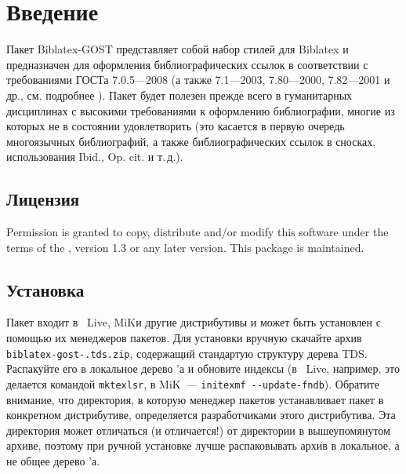 \documentclass[10pt,a4paper,headings=small,numbers=enddot,english,russian]{ltxdockit}
\newcommand*{\biblatex}{Biblatex\xspace}
\newcommand*{\biblatexgost}{Biblatex-GOST\xspace}
\begin{document}
\printtitlepage
\tableofcontents
\listoftables

\section{Введение}
\label{sec:int}

Пакет \biblatexgost{} представляет
  собой набор стилей для
  \biblatex{}\unspace{}
  и предназначен для оформления библиографических ссылок в соответствии с требованиями
  ГОСТа 7.0.5---2008
  (а также 7.1---2003, 7.80---2000, 7.82---2001 и др., см. подробнее ).
Пакет будет полезен прежде всего в
  гуманитарных дисциплинах с высокими требованиями к оформлению библиографии, многие из
  которых \bibtex не в состоянии удовлетворить (это касается в первую очередь многоязычных
  библиографий, а также библиографических ссылок в сносках, использования Ibid., Op. cit. и
  т.\,д.).

\subsection{Лицензия}
\label{sec:lic}

Permission is granted to copy, distribute and\slash or modify this software under the
terms of the \lppl, version 1.3 or any later
version.
This package is
maintained.

\subsection{Установка}
\label{sec:install}

Пакет входит в \tex~Live, MiK\tex и другие дистрибутивы и может быть установлен
с помощью их менеджеров пакетов. Для установки вручную скачайте архив
\texttt{biblatex-gost-.tds.zip}, содержащий стандартую структуру дерева TDS.
Распакуйте его в локальное дерево \tex'а и
обновите индексы (в \tex~Live, например, это делается командой \texttt{mktexlsr},
в MiK\tex~--- \texttt{initexmf -{}-update-fndb}). Обратите внимание, что директория,
в которую менеджер пакетов устанавливает пакет в конкретном дистрибутиве,
определяется разработчиками этого дистрибутива.
Эта директория может отличаться (и отличается!) от директории
в вышеупомянутом архиве, поэтому при ручной установке лучше распаковывать
архив в локальное, а не общее дерево \tex'а.
\end{document}
